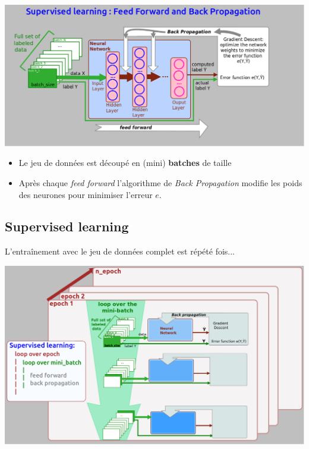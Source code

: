 \documentclass[10pt,serif,mathserif,compress,hyperref={colorlinks}]{beamer}
\begin{document}
\begin{frame}{}
  \includegraphics[width=1.2\textwidth]{./images/NetworkTraining.png}
  \begin{itemize}
  \item <2-> Le jeu de données est découpé en (mini) {\bf batches} de taille 
  \item <3-> Après chaque {\em feed forward} l'algorithme de {\em Back Propagation} modifie les poids
    des neurones pour minimiser l'erreur $e$.
  \end{itemize}
\end{frame}

\subsection{Supervised learning}

\begin{frame}{}
  
L'entraînement avec le jeu de données complet est répété  fois...

\includegraphics[width=\textwidth]{./images/NetworkTraining_2.png}
  
\end{frame}
\end{document}
